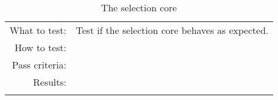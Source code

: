 \begin{table}[H]
  \begin{tabular}{r | p{9cm}}
    \noalign{\smallskip}\hline\noalign{\smallskip}
    
    What to test:  &  Test if the selection core behaves as expected. \\

    \noalign{\smallskip}\hline\noalign{\smallskip}

    How to test:   &   \\
                      
    \noalign{\smallskip}\hline\noalign{\smallskip}

    Pass criteria: &    
                        \\
    \noalign{\smallskip}\hline\noalign{\smallskip}
    
    Results: &      
                    \\
   \noalign{\smallskip}\hline\noalign{\smallskip}
  
  
  \end{tabular}
  \caption{The selection core}
  \label{testing:components:genetic_pipeline:selection_core}
\end{table}
